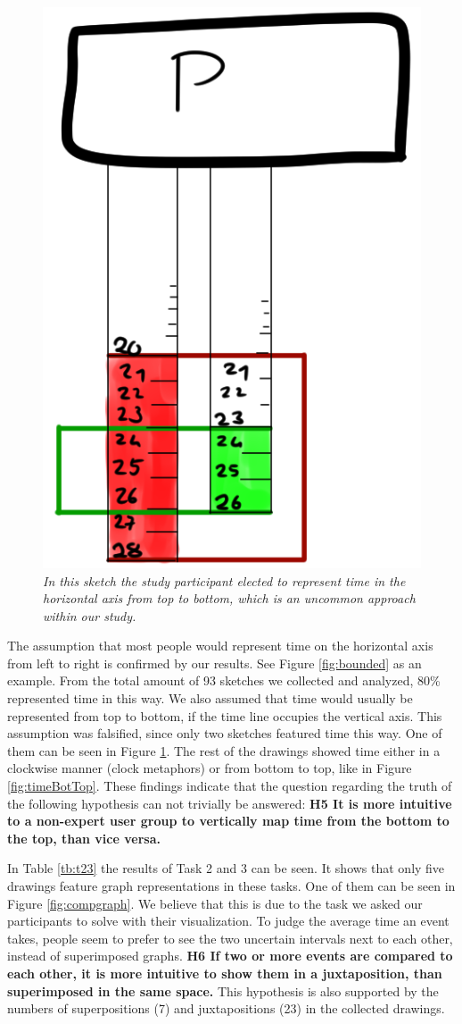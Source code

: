 \begin{figure}[H]
	\centering
	\captionsetup{width=0.8\textwidth}
	\includegraphics[height=0.45\textwidth]{figures/topbot.png}
	\caption{\textit{In this sketch the study participant elected to represent time in the horizontal axis from top to bottom, which is an uncommon approach within our study.}}
	\label{fig:topbot}
\end{figure}

The assumption that most people would represent time on the horizontal axis from left to right is confirmed by our results. See Figure \ref{fig:bounded} as an example. From the total amount of 93 sketches we collected and analyzed, 80\% represented time in this way. We also assumed that time would usually be represented from top to bottom, if the time line occupies the vertical axis. This assumption was falsified, since only two sketches featured time this way. One of them can be seen in Figure \ref{fig:topbot}. The rest of the drawings showed time either in a clockwise manner (clock metaphors) or from bottom to top, like in Figure \ref{fig:timeBotTop}. These findings indicate that the question regarding the truth of the following hypothesis can not trivially be answered: \textbf{H5 It is more intuitive to a non-expert user group to vertically map time from the bottom to the top, than vice versa.}\par \medskip

In Table \ref{tb:t23} the results of Task 2 and 3 can be seen. It shows that only five drawings feature graph representations in these tasks. One of them can be seen in Figure \ref{fig:compgraph}. We believe that this is due to the task we asked our participants to solve with their visualization. To judge the average time an event takes, people seem to prefer to see the two uncertain intervals next to each other, instead of superimposed graphs. \textbf{H6 If two or more events are compared to each other, it is more intuitive to show them in a juxtaposition, than superimposed in the same space.} This hypothesis is also supported by the numbers of superpositions (7) and juxtapositions (23) in the collected drawings. \par \medskip


